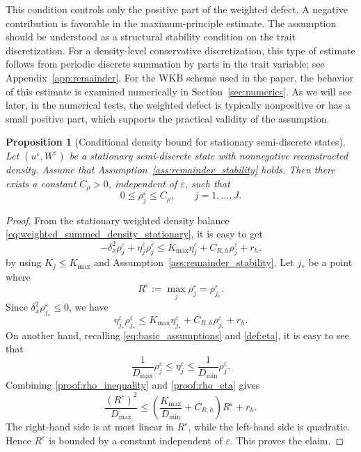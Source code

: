\documentclass[11pt]{article}
\newtheorem{proposition}{Proposition}[section]
\begin{document}
This condition controls only the positive part of the weighted defect.  A
negative contribution is favorable in the maximum-principle estimate.  The
assumption should be understood as a structural stability condition on the trait
discretization.  For a density-level conservative discretization, this type of
estimate follows from periodic discrete summation by parts in the trait
variable; see Appendix~\ref{app:remainder}.  
For the WKB scheme used in the paper,  the behavior of this estimate is examined numerically in
Section~\ref{sec:numerics}.  
As we will see later, in the numerical tests, the weighted defect is
typically nonpositive or has a small positive part, which supports the practical
validity of the assumption.



\begin{proposition}[Conditional density bound for stationary semi-discrete states]
\label{prop:uniform_bound_stationary_mass}
Let \((u^\varepsilon,W^\varepsilon)\) be a stationary semi-discrete state with
nonnegative reconstructed density.  Assume that
Assumption~\ref{ass:remainder_stability} holds.  Then there exists a constant
\(C_\rho>0\), independent of \(\varepsilon\), such that
\[
    0\le \rho_j^\varepsilon\le C_\rho,
    \qquad j=1,\ldots,J .
\]
\end{proposition}

\begin{proof}
From the stationary weighted density balance \eqref{eq:weighted_summed_density_stationary}, 
it is easy to get 
\[
    -\delta_x^2\rho_j^\varepsilon
    +
    \eta_j^\varepsilon\rho_j^\varepsilon
    \le
    K_{\max}\eta_j^\varepsilon
    +
    C_{R,h}\rho_j^\varepsilon
    +
    r_h .
\]
by using  \(K_j\le K_{\max}\) and Assumption~\ref{ass:remainder_stability}. 
Let \(j_*\) be a point where
\[
    R^\varepsilon
    :=
    \max_j \rho_j^\varepsilon
    =
    \rho_{j_*}^\varepsilon .
\]
Since \(\delta_x^2\rho_{j_*}^\varepsilon\le0\), we have
\begin{equation}\label{proof:rho_inequality}
    \eta_{j_*}^\varepsilon \rho_{j_*}^\varepsilon
    \le
    K_{\max}\eta_{j_*}^\varepsilon
    +
    C_{R,h}\rho_{j_*}^\varepsilon
    +
    r_h .
\end{equation}
On another hand, recalling \eqref{eq:basic_assumptions} and \eqref{def:eta}, it is easy to see that 
\begin{equation}\label{proof:rho_eta}
    \frac1{D_{\max}}\rho_j^\varepsilon
    \le
    \eta_j^\varepsilon
    \le
    \frac1{D_{\min}}\rho_j^\varepsilon .
\end{equation}
Combining \eqref{proof:rho_inequality} and \eqref{proof:rho_eta} gives
\[
    \frac{(R^\varepsilon)^2}{D_{\max}}
    \le
    \left(
        \frac{K_{\max}}{D_{\min}}+C_{R,h}
    \right)R^\varepsilon
    +
    r_h .
\]
The right-hand side is at most linear in \(R^\varepsilon\), while the left-hand
side is quadratic.  Hence \(R^\varepsilon\) is bounded by a constant independent
of \(\varepsilon\).  This proves the claim.
\end{proof}
\end{document}

